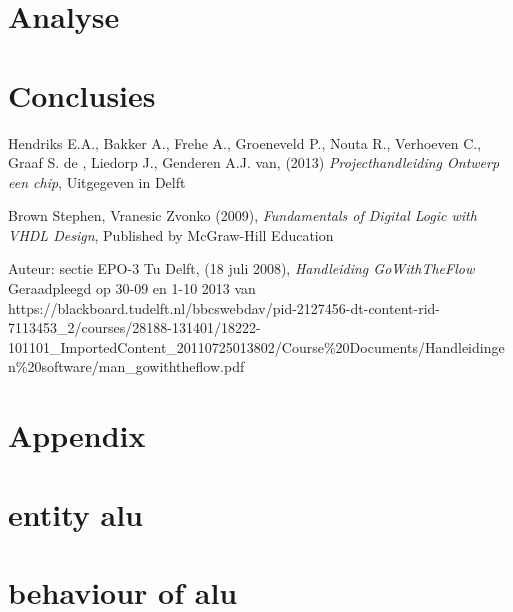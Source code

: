 \documentclass[11pt,twoside,a4paper]{article}
\begin{document}
\section{Analyse}


\section{Conclusies}





\newpage
\begin{thebibliography}{7} %
%
Hendriks E.A., Bakker A., Frehe A., Groeneveld P., Nouta R., Verhoeven C., Graaf S. de , Liedorp J., Genderen A.J. van,  (2013) \textit{Projecthandleiding Ontwerp een chip}, Uitgegeven in Delft

Brown Stephen, Vranesic Zvonko (2009), \textit{Fundamentals of Digital Logic with VHDL Design}, Published by McGraw-Hill Education


Auteur: sectie EPO-3 Tu Delft, (18 juli 2008), \textit{Handleiding GoWithTheFlow } Geraadpleegd op 30-09 en 1-10 2013 van https://blackboard.tudelft.nl/bbcswebdav/pid-2127456-dt-content-rid-7113453\_2/courses/28188-131401/18222-101101\_ImportedContent\_20110725013802/Course\%20Documents/Handleidingen\%20software/man\_gowiththeflow.pdf



\end{thebibliography}





\scriptsize
\newpage

\section{Appendix}

\appendix
\section{entity alu}
\label{entity}



\section{behaviour of alu}
\label{behaviour}

\end{document}
